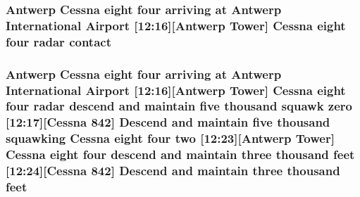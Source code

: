 \subsubsection[{\texorpdfstring{contact}{contact}}]{\setlength{\rightskip}{0pt plus 5cm}Antwerp {\bf Cessna} eight four arriving at Antwerp International {\bf Airport} \mbox{[}12\+:16\mbox{]}\mbox{[}Antwerp {\bf Tower}\mbox{]} {\bf Cessna} eight four radar contact}\hypertarget{happyDay1ExpectedATC_8txt_aabccce409c3b74e74ea0c068d4a73f10}{}\label{happyDay1ExpectedATC_8txt_aabccce409c3b74e74ea0c068d4a73f10}
\subsubsection[{\texorpdfstring{feet}{feet}}]{\setlength{\rightskip}{0pt plus 5cm}Antwerp {\bf Cessna} eight four arriving at Antwerp International {\bf Airport} \mbox{[}12\+:16\mbox{]}\mbox{[}Antwerp {\bf Tower}\mbox{]} {\bf Cessna} eight four radar descend and maintain five {\bf thousand} squawk {\bf zero} \mbox{[}12\+:17\mbox{]}\mbox{[}{\bf Cessna} 842\mbox{]} Descend and maintain five {\bf thousand} {\bf squawking} {\bf Cessna} eight four {\bf two} \mbox{[}12\+:23\mbox{]}\mbox{[}Antwerp {\bf Tower}\mbox{]} {\bf Cessna} eight four descend and maintain three {\bf thousand} feet \mbox{[}12\+:24\mbox{]}\mbox{[}{\bf Cessna} 842\mbox{]} Descend and maintain three {\bf thousand} feet}\hypertarget{happyDay1ExpectedATC_8txt_adb5a296986a5b6019ec88f520f243c26}{}\label{happyDay1ExpectedATC_8txt_adb5a296986a5b6019ec88f520f243c26}
